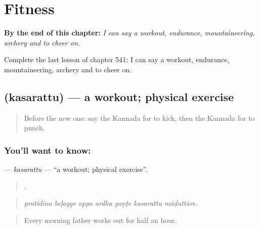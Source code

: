 
\chapter{Fitness}
\label{ch:ka-fitness}

\begin{chapteropening}
\textbf{By the end of this chapter:} \emph{I can say a workout, endurance, mountaineering, archery and to cheer on.}

Complete the last lesson of chapter 541: I can say a workout, endurance, mountaineering, archery and to cheer on.
\end{chapteropening}

\section[\texorpdfstring{\kn{ಕಸರತ್ತು} (kasarattu)}{ಕಸರತ್ತು (kasarattu)}]{ (kasarattu) — a workout; physical exercise}

\label{lesson:KA-C541-kasarattu}



\begin{quote}
Before the new one: say the Kannada for to kick, then the Kannada for to punch.
\end{quote}

\subsection*{You'll want to know: }
\textbf{} — \emph{kasarattu} — \textquotedblleft{}a workout; physical exercise\textquotedblright{}.

\begin{quote}
      .
\end{quote}

\begin{quote}
\emph{pratidina beḷagge appa ardha gaṇṭe kasarattu māḍuttāre.}
\end{quote}

\begin{quote}
Every morning father works out for half an hour.
\end{quote}

